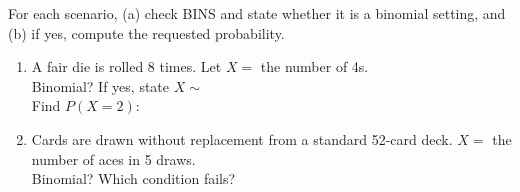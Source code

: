 \documentclass[10pt]{article}
\begin{document}
\vspace{0.1in}

\begin{practicebox}
\small For each scenario, (a) check BINS and state whether it is a binomial setting,
and (b) if yes, compute the requested probability.

\vspace{6pt}
\begin{enumerate}[leftmargin=1.5em, itemsep=10pt]
  \item A fair die is rolled 8 times. Let $X =$ the number of 4s. \\
        Binomial? \blank{1.5cm} \quad If yes, state $X \sim$ \blank{3cm}\\[4pt]
        Find $P(X = 2)$: \blank{9cm}

  \item Cards are drawn without replacement from a standard 52-card deck.
        $X =$ the number of aces in 5 draws.\\
        Binomial? \blank{1.5cm} \quad Which condition fails? \blank{7cm}
\end{enumerate}
\end{practicebox}
\end{document}

